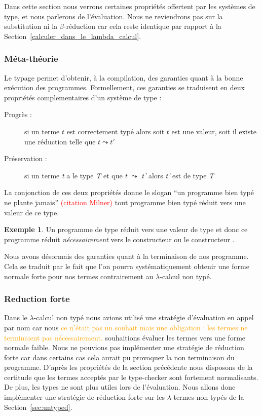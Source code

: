 \documentclass {article}
\theoremstyle{definition}
\newtheorem{example}{Exemple}
\theoremstyle{remark}
\newcommand{\todo}[1]{\textcolor{red}{#1}}
\newcommand{\attention}[1]{\textcolor{orange}{#1}}
\begin{document}
Dans cette section nous verrons certaines propriétés offertent par les systèmes de type, et nous parlerons 
de l'évaluation. Nous ne reviendrons pas sur la substitution ni la $\beta$-réduction car cela reste identique par 
rapport à la Section~\ref{calculer_dans_le_lambda_calcul}.

\subsubsection{Méta-théorie}

Le typage permet d'obtenir, à la compilation, des garanties quant à la
bonne exécution des programmes.  Formellement, ces garanties se traduisent en deux propriétés complementaires d'un système de type :
\begin{description}
\item[Progrès :] si un terme \(t\) est correctement typé alors soit \(t\) est une valeur, soit il
 existe une réduction telle que \(t \leadsto t'\)
\item[Préservation :] si un terme \emph{t} a le type \emph{T}
et que \emph{t} $\leadsto$ \emph{t'} alors \emph{t'} est de type \emph{T}
\end{description}

La conjonction de ces deux propriétés donne le slogan ``un programme
bien typé ne plante jamais'' \todo{(citation Milner)} tout programme
bien typé réduit vers une valeur de ce type.

\begin{example}
  Un programme de type \bool{} réduit vers une valeur de type \bool{}
  et donc ce programme réduit \emph{nécessairement} vers le
  constructeur \true{} ou le constructeur \false{}.
\end{example}

Nous avons désormais des garanties quant à la terminaison de nos programme.
Cela se traduit par le fait que l'on pourra systématiquement obtenir une 
forme normale forte pour nos termes contrairement au \(\lambda\)-calcul non typé.


\subsubsection{Reduction forte}

\label{reduction_forte}
Dans le \(\lambda\)-calcul non typé nous avions utilisé une stratégie d'évaluation en appel par nom
car nous \attention{ce n'était pas un souhait mais une obligation : les termes ne terminaient pas nécessairement.} souhaitions évaluer les termes vers une forme normale faible. Nous ne pouvions pas implémenter 
une stratégie de réduction forte car dans certains cas cela aurait pu provoquer la non terminaison du 
programme.
D'après les propriétés de la section précédente nous disposons de la certitude que les termes acceptés  par le type-checker sont fortement normalisants. De plus, les types ne sont plus utiles lors de l'évaluation. 
Nous allons donc implémenter une stratégie de réduction forte sur les \(\lambda\)-termes non typés de la Section~\ref{sec:untyped}.
\end{document}
